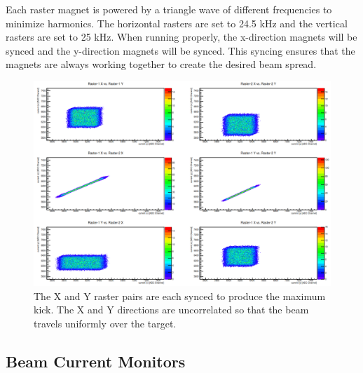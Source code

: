 Each raster magnet is powered by a triangle wave of different frequencies to minimize harmonics. The horizontal rasters are set to 24.5 kHz and the vertical rasters are set to 25 kHz. When running properly, the x-direction magnets will be synced and the y-direction magnets will be synced. This syncing ensures that the magnets are always working together to create the desired beam spread.

\begin{figure}
	\includegraphics[width=\linewidth]{./chap2-exp/fig/raster_sync.png}
	\caption{The X and Y raster pairs are each synced to produce the maximum kick. The X and Y directions are uncorrelated so that the beam travels uniformly over the target.}
	\label{fig:raster}
\end{figure}

\subsection{Beam Current Monitors}